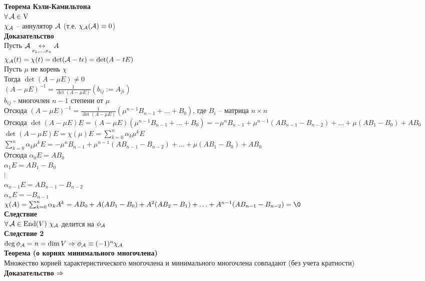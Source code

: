 \documentclass[12pt]{article}
\begin{document}
\textbf{Теорема Кэли-Камильтона}\\
$\forall\, \mathcal{A} \in \operatorname{V}$\\
$\chi_\mathcal{A}$ -- аннулятор $\mathcal{A}$ (т.е. $\chi_\mathcal{A}(\mathcal{A}) \equiv 0$)\\
\textbf{Доказательство}\\
Пусть $\mathcal{A} \underset{e_1, \ldots, e_n}{\leftrightarrow} A$\\
$\chi_\mathcal{A}(t) = \chi(t) = \det (\mathcal{A} - t\epsilon) = \det (A-tE)$\\
Пусть $\mu$ не корень $\chi$\\
Тогда $\det(A-\mu E) \neq 0$\\
$(A-\mu E)^{-1} = \frac1{\det(A - \mu E)}(b_{ij} := A_{ji})$\\
$b_{ij}$ - многочлен $n-1$ степени от $\mu$\\
Отсюда $(A-\mu E)^{-1} = \frac1{\det(A-\mu E)}(\mu^{n-1} B_{n-1} + \ldots + B_0)$, где $B_i$ -- матрица $n \times n$\\
Отсюда $\det (A-\mu E)E = (A-\mu E)(\mu^{n-1} B_{n-1} + \ldots + B_0) = -\mu^n B_{n-1} + \mu^{n-1}(AB_{n-1}-B_{n-2}) + \ldots + \mu (AB_1 - B_0) + AB_0$\\
$\det(A-\mu E)E = \chi(\mu) E = \sum_{k=0}^n \alpha_k \mu^k E$\\
$\sum_{k=0}^n \alpha_k \mu^k E = -\mu^n B_{n-1} + \mu^{n-1}(AB_{n-1}-B_{n-2}) + \ldots + \mu (AB_1 - B_0) + AB_0$\\
Отсюда $\alpha_0 E = AB_0$\\
$\alpha_1 E = AB_1 - B_0$\\
$\vdots$\\
$\alpha_{n-1} E = AB_{n-1} - B_{n-2}$\\
$\alpha_n E = -B_{n-1}$\\
$\chi (A) = \sum_{k=0}^n \alpha_k A^k = AB_0 + A(AB_1 - B_0) + A^2 (AB_2 - B_1) + \ldots + A^{n-1} (AB_{n-1}-B_{n-2}) = \0$\\
\textbf{Следствие}\\
$\forall\, \mathcal{A} \in \operatorname{End}(V)\ \chi_\mathcal{A}$ делится на $\phi_\mathcal{A}$\\
\textbf{Следствие 2}\\
$\deg \phi_\mathcal{A} = n = \dim V \Rightarrow \phi_\mathcal{A} \equiv (-1)^n\chi_\mathcal{A}$\\
\textbf{Теорема (о корнях минимального многочлена)}\\
Множество корней характеристического многочлена и минимального многочлена совпадают (без учета кратности)\\
\textbf{Доказательство $\Rightarrow$}\\
\end{document}
